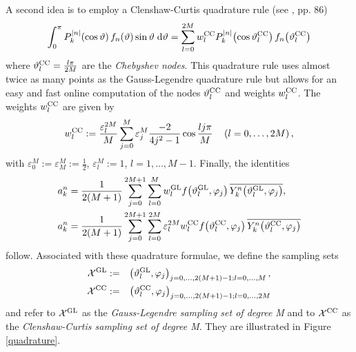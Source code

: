 A second idea is to employ a Clenshaw-Curtis quadrature rule (see \cite{dara}, pp. 86)
\[
  \int_{0}^{\pi} P_{k}^{\left\vert n\right\vert}{\hspace{-0.4ex}}\left(\cos \vartheta\right) f_{n}{\hspace{-0.4ex}}\left(\vartheta\right) \sin \vartheta \; \text{\rm{d}} \vartheta = \sum_{l=0}^{2M} w_{l}^{\mbox{\scriptsize\rm{CC}}} P_{k}^{\left\vert n\right\vert}{\hspace{-0.4ex}}\left(\cos \vartheta_{l}^{\mbox{\scriptsize\rm{CC}}}\right) f_{n}{\hspace{-0.4ex}}\left(\vartheta_{l}^{\mbox{\scriptsize\rm{CC}}}\right)
\]
where $\vartheta_{l}^{\mbox{\scriptsize\rm{CC}}} = \frac{l\pi}{2M}$ are the \emph{Chebyshev nodes}.
This quadrature rule uses almost twice as many points as the Gauss-Legendre quadrature rule but allows for an easy and fast online computation of the nodes $\vartheta_{l}^{\mbox{\scriptsize\rm{CC}}}$ and weights $w_{l}^{\mbox{\scriptsize\rm{CC}}}$. The weights $ w_{l}^{\mbox{\scriptsize\rm{CC}}}$ 
are given by
\[ 
  w_{l}^{\mbox{\scriptsize\rm{CC}}} := \frac{\varepsilon_{l}^{2M}}{M} \sum_{j=0}^{M}
  \varepsilon_{j}^{M} \frac{-2}{4j^2-1} \cos\frac{lj\pi}{M} 
  \quad \left(l=0,\ldots,2M\right),
\]
with $\varepsilon_{0}^{M} := \varepsilon_{M}^{M} := \frac{1}{2}$, 
$\varepsilon_{l}^{M} := 1$, $l = 1,\ldots,M-1$.
Finally, the identities 
\begin{equation}
  \label{NFSFT:iDSFT}
  \begin{split}
    a_{k}^n & = \frac{1}{2(M+1)} \sum_{j=0}^{2M+1} \sum_{l=0}^{M} w_{l}^{\mbox{\scriptsize\rm{GL}}} f{\hspace{-0.4ex}}\left(\vartheta_{l}^{\mbox{\scriptsize\rm{GL}}},\varphi_{j}\right) \overline{Y_{k}^n{\hspace{-0.4ex}}\left(\vartheta_{l}^{\mbox{\scriptsize\rm{GL}}},\varphi_{j}\right)},\\
    a_{k}^n & = \frac{1}{2(M+1)} \sum_{j=0}^{2M+1} \sum_{l=0}^{2M} \varepsilon_{l}^{2M} w_{l}^{\mbox{\scriptsize\rm{CC}}} f{\hspace{-0.4ex}}\left(\vartheta_{l}^{\mbox{\scriptsize\rm{CC}}},\varphi_{j}\right) 
  \overline{Y_{k}^n{\hspace{-0.4ex}}\left(\vartheta_{l}^{\mbox{\scriptsize\rm{CC}}},\varphi_{j}\right)}
  \end{split}
\end{equation}
follow. Associated with these quadrature formulae, we define the sampling sets
\begin{eqnarray*}
  \mathcal{X}^{\mbox{\scriptsize\rm{GL}}} & := & \left(\vartheta_{l}^{\mbox{\scriptsize\rm{GL}}},\varphi_{j}\right)_{j=0,\dots,2(M+1)-1;l=0,\dots,M},\\
  \mathcal{X}^{\mbox{\scriptsize\rm{CC}}} & := & \left(\vartheta_{l}^{\mbox{\scriptsize\rm{CC}}},\varphi_{j}\right)_{j=0,\dots,2(M+1)-1;l=0,\dots,2M}
\end{eqnarray*}
and refer to $\mathcal{X}^{\mbox{\scriptsize\rm{GL}}}$ as the \emph{Gauss-Legendre sampling set of degree M} and to $\mathcal{X}^{\mbox{\scriptsize\rm{CC}}}$ as the 
\emph{Clenshaw-Curtis sampling set of degree M}. They are illustrated in Figure \ref{quadrature}.
